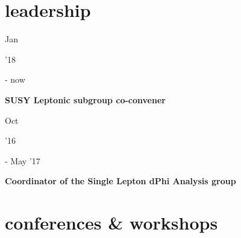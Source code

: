 \documentclass[]{cv} %
\begin{document}
\section{leadership}

\begin{entrylist}

  \entry
  {\parbox[t]{\parboxWidthOne}{Jan}\parbox[t]{\parboxWidthTwo}{\hfill '18} - now}
  {\textbf{SUSY Leptonic subgroup co-convener}}
  {}
  {}

  \entry
  {\parbox[t]{\parboxWidthOne}{Oct}\parbox[t]{\parboxWidthTwo}{\hfill '16} - May '17}
  {\textbf{Coordinator of the Single Lepton dPhi Analysis group}}
  {}
  {}

\end{entrylist}

\newpage
\section{conferences \& workshops}
\end{document}
